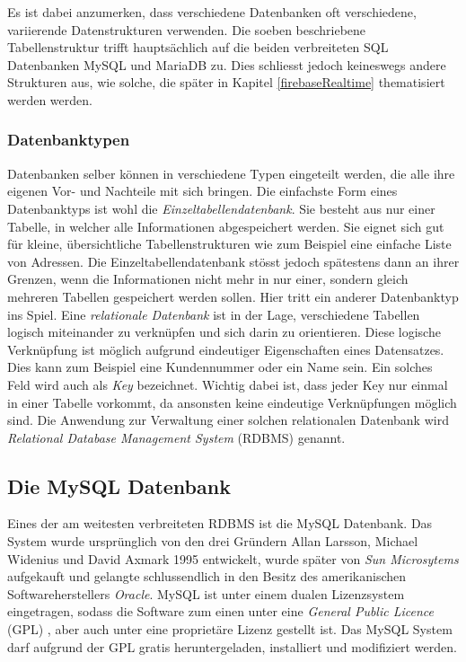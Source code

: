 \documentclass[../main.tex]{subfiles}
\begin{document}
	Es ist dabei anzumerken, dass verschiedene Datenbanken oft verschiedene, variierende Datenstrukturen verwenden. Die soeben beschriebene Tabellenstruktur trifft hauptsächlich auf die beiden verbreiteten SQL Datenbanken MySQL und MariaDB zu. Dies schliesst jedoch keineswegs andere Strukturen aus, wie solche, die später in Kapitel \ref{firebaseRealtime} thematisiert werden werden.
	
	\subsubsection*{Datenbanktypen}
	Datenbanken selber können in verschiedene Typen eingeteilt werden, die alle ihre eigenen Vor- und Nachteile mit sich bringen. Die einfachste Form eines Datenbanktyps ist wohl die \emph{Einzeltabellendatenbank}. Sie besteht aus nur einer Tabelle, in welcher alle Informationen abgespeichert werden. Sie eignet sich gut für kleine, übersichtliche Tabellenstrukturen wie zum Beispiel eine einfache Liste von Adressen. Die Einzeltabellendatenbank stösst jedoch spätestens dann an ihrer Grenzen, wenn die Informationen nicht mehr in nur einer, sondern gleich mehreren Tabellen gespeichert werden sollen. Hier tritt ein anderer Datenbanktyp ins Spiel. Eine \emph{relationale Datenbank} ist in der Lage, verschiedene Tabellen logisch miteinander zu verknüpfen und sich darin zu orientieren. Diese logische Verknüpfung ist möglich aufgrund eindeutiger Eigenschaften eines Datensatzes. Dies kann zum Beispiel eine Kundennummer oder ein Name sein. Ein solches Feld wird auch als \emph{Key} bezeichnet. Wichtig dabei ist, dass jeder Key nur einmal in einer Tabelle vorkommt, da ansonsten keine eindeutige Verknüpfungen möglich sind. Die Anwendung zur Verwaltung einer solchen relationalen Datenbank wird \emph{Relational Database Management System} (RDBMS) genannt. \cite[S. 745 - 751]{IT-Handbuch}
	
	\subsection{Die MySQL Datenbank}
	Eines der am weitesten verbreiteten RDBMS ist die MySQL Datenbank. Das System wurde ursprünglich von den drei Gründern Allan Larsson, Michael Widenius und David Axmark 1995 entwickelt, wurde später von \emph{Sun Microsytems} aufgekauft und gelangte schlussendlich in den Besitz des amerikanischen Softwareherstellers \emph{Oracle}. MySQL ist unter einem dualen Lizenzsystem eingetragen, sodass die Software zum einen unter eine \emph{General Public Licence} (GPL) \cite{GPL}, aber auch unter eine proprietäre Lizenz \cite{proprietaereLizenz} gestellt ist. \cite{tecmint.com} Das MySQL System darf aufgrund der GPL gratis heruntergeladen, installiert und modifiziert werden.
	
\end{document}
